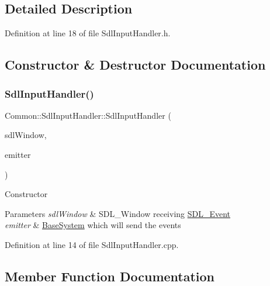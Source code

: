 \subsection{Detailed Description}


Definition at line 18 of file Sdl\+Input\+Handler.\+h.



\subsection{Constructor \& Destructor Documentation}
\mbox{\label{class_common_1_1_sdl_input_handler_ac90801d445e5c31dcd2b965ca3eaef53}} 
\subsubsection{\texorpdfstring{Sdl\+Input\+Handler()}{SdlInputHandler()}}
{\footnotesize\ttfamily Common\+::\+Sdl\+Input\+Handler\+::\+Sdl\+Input\+Handler (\begin{DoxyParamCaption}\item[{S\+D\+L\+\_\+\+Window $\ast$}]{sdl\+Window,  }\item[{\hyperlink{class_common_1_1_base_system}{Base\+System} $\ast$}]{emitter }\end{DoxyParamCaption})}

Constructor 
\begin{DoxyParams}{Parameters}
{\em sdl\+Window} & S\+D\+L\+\_\+\+Window receiving \hyperlink{union_s_d_l___event}{S\+D\+L\+\_\+\+Event} \\
\hline
{\em emitter} & \hyperlink{class_common_1_1_base_system}{Base\+System} which will send the events \\
\hline
\end{DoxyParams}


Definition at line 14 of file Sdl\+Input\+Handler.\+cpp.



\subsection{Member Function Documentation}
\mbox{\label{class_common_1_1_sdl_input_handler_a24ecda74ffbdad833809ec916ca5aa36}} 

